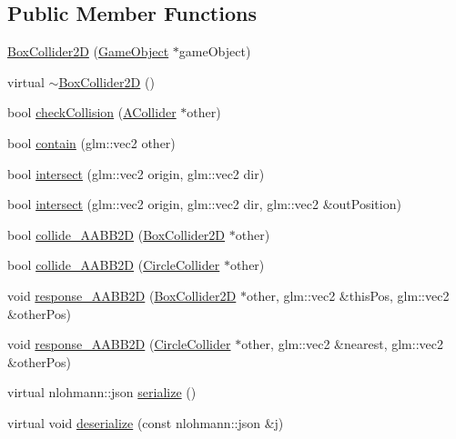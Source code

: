 \subsection*{Public Member Functions}
\begin{DoxyCompactItemize}
\item 
\mbox{\hyperlink{class_beer_engine_1_1_component_1_1_box_collider2_d_a8b3e9562b1b4fdf9f6444b47c10ffa93}{Box\+Collider2D}} (\mbox{\hyperlink{class_beer_engine_1_1_game_object}{Game\+Object}} $\ast$game\+Object)
\item 
virtual \mbox{\hyperlink{class_beer_engine_1_1_component_1_1_box_collider2_d_a56c4a94ddb75c8f455aacd79a2bed429}{$\sim$\+Box\+Collider2D}} ()
\item 
bool \mbox{\hyperlink{class_beer_engine_1_1_component_1_1_box_collider2_d_aeaac56770926a57af78e7af0379c30ca}{check\+Collision}} (\mbox{\hyperlink{class_beer_engine_1_1_component_1_1_a_collider}{A\+Collider}} $\ast$other)
\item 
bool \mbox{\hyperlink{class_beer_engine_1_1_component_1_1_box_collider2_d_a7147a553f4200c6cf4031af2ddb70154}{contain}} (glm\+::vec2 other)
\item 
bool \mbox{\hyperlink{class_beer_engine_1_1_component_1_1_box_collider2_d_a6ebe330aba3bb7f8f7a84686b0717e5d}{intersect}} (glm\+::vec2 origin, glm\+::vec2 dir)
\item 
bool \mbox{\hyperlink{class_beer_engine_1_1_component_1_1_box_collider2_d_a41f84de78c4441ec2c74a0d3609f2c09}{intersect}} (glm\+::vec2 origin, glm\+::vec2 dir, glm\+::vec2 \&out\+Position)
\item 
bool \mbox{\hyperlink{class_beer_engine_1_1_component_1_1_box_collider2_d_a2b6af1325c64867d59cb11655c41a262}{collide\+\_\+\+A\+A\+B\+B2D}} (\mbox{\hyperlink{class_beer_engine_1_1_component_1_1_box_collider2_d}{Box\+Collider2D}} $\ast$other)
\item 
bool \mbox{\hyperlink{class_beer_engine_1_1_component_1_1_box_collider2_d_a36f2e8987bd65106250ca6eea7003e1b}{collide\+\_\+\+A\+A\+B\+B2D}} (\mbox{\hyperlink{class_beer_engine_1_1_component_1_1_circle_collider}{Circle\+Collider}} $\ast$other)
\item 
void \mbox{\hyperlink{class_beer_engine_1_1_component_1_1_box_collider2_d_ab10c2db9816e643482ed59d35b0cff69}{response\+\_\+\+A\+A\+B\+B2D}} (\mbox{\hyperlink{class_beer_engine_1_1_component_1_1_box_collider2_d}{Box\+Collider2D}} $\ast$other, glm\+::vec2 \&this\+Pos, glm\+::vec2 \&other\+Pos)
\item 
void \mbox{\hyperlink{class_beer_engine_1_1_component_1_1_box_collider2_d_a5acb3137ff57c6511993f57c54b405b3}{response\+\_\+\+A\+A\+B\+B2D}} (\mbox{\hyperlink{class_beer_engine_1_1_component_1_1_circle_collider}{Circle\+Collider}} $\ast$other, glm\+::vec2 \&nearest, glm\+::vec2 \&other\+Pos)
\item 
virtual nlohmann\+::json \mbox{\hyperlink{class_beer_engine_1_1_component_1_1_box_collider2_d_a9172319becb9c609206265378ad04724}{serialize}} ()
\item 
virtual void \mbox{\hyperlink{class_beer_engine_1_1_component_1_1_box_collider2_d_ab7de4fc1ab97576308f9f5bb76098a54}{deserialize}} (const nlohmann\+::json \&j)
\end{DoxyCompactItemize}
